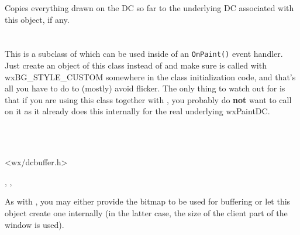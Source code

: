 \label{wxbuffereddcdtor}

Copies everything drawn on the DC so far to the underlying DC associated with
this object, if any.



\section{}\label{wxbufferedpaintdc}

This is a subclass of  which can be used
inside of an \texttt{OnPaint()} event handler. Just create an object of this class instead
of  and make sure 
is called with wxBG\_STYLE\_CUSTOM somewhere in the class initialization code, and that's all
you have to do to (mostly) avoid flicker. The only thing to watch out for is that if you are
using this class together with , you probably
do \textbf{not} want to call  on it as it
already does this internally for the real underlying wxPaintDC.


\\
\\


<wx/dcbuffer.h>


,\rtfsp
{},\rtfsp
{}



\label{wxbufferedpaintdcctor}



As with , you may either provide the
bitmap to be used for buffering or let this object create one internally (in
the latter case, the size of the client part of the window is used).

